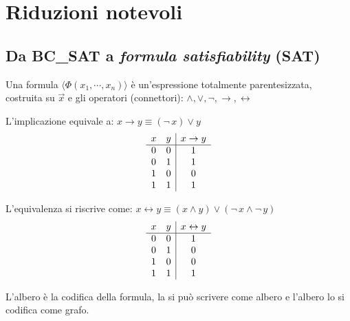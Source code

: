 \section{Riduzioni notevoli}

\subsection{Da BC\_SAT a \emph{formula satisfiability} (SAT)}

\begin{definition}[Formula]
    \label{def:formula}
    Una formula $\langle \Phi \left( x_1, \cdots, x_n \right) \rangle$ è un'espressione totalmente parentesizzata, costruita su $\vec{x}$ e gli operatori (connettori):
    $\wedge, \vee, \neg, \to, \leftrightarrow$
\end{definition}

L'implicazione equivale a: $x \to y \equiv ( \neg \, x ) \vee y$
\begin{equation*}
    \begin{array}[h]{cc|c}
        x & y & x \to y \\
        \hline
        0 & 0 & 1 \\
        0 & 1 & 1 \\
        1 & 0 & 0 \\
        1 & 1 & 1 \\
    \end{array}
\end{equation*}

L'equivalenza si riscrive come:
$ x \leftrightarrow y \equiv 
\left( x \wedge y \right)
\vee
\left( \neg \, x \wedge \neg \, y \right)
$
\begin{equation*}
    \begin{array}[h]{cc|c}
        x & y & x \leftrightarrow y \\
        \hline
        0 & 0 & 1 \\
        0 & 1 & 0 \\
        1 & 0 & 0 \\
        1 & 1 & 1 \\
    \end{array}
\end{equation*}


L'albero è la codifica della formula, la si può scrivere come albero e l'albero lo si codifica come grafo.

